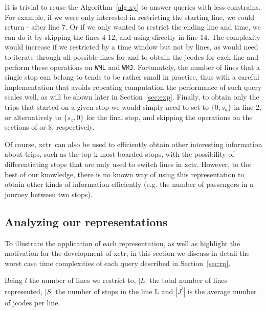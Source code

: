     It is trivial to reuse the Algorithm~\ref{alg:xy} to answer queries with less constrains. For example, if we were only interested in restricting the starting line, we could return - after line 7. Or if we only wanted to restrict the ending line and time, we can do it by skipping the lines 4-12, and using directly  in line 14. The complexity would increase if we restricted by a time window but not by lines, as would need to iterate through all possible lines for  and  to obtain the jcodes for each line and perform these operations on \texttt{WML} and \texttt{WMJ}. Fortunately, the number of lines that a single stop can belong to tends to be rather small in practice, thus with a careful implementation that avoids repeating computation the performance of such query scales well, as will be shown later in Section~\ref{sec:exp}. Finally, to obtain only the trips that started on a given stop we would simply need to set  to $\{0,s_a\}$ in line 2, or alternatively to $\{s_z,0\}$ for the final stop, and skipping the operations on the sections of  or $\$$, respectively.
    
    Of course, \gls{xctr}~can also be used to efficiently obtain other interesting information about trips, such as the top k most boarded stops, 
    with the possibility of differentiating stops that are only used to switch lines in \gls{xctr}. However, to the best of our knowledge, there is no known way of using this representation to obtain other kinds of information efficiently (e.g. the number of passengers in a journey between two stops).
	
	\subsection{Analyzing our representations}
	To illustrate the application of each representation, as well as highlight the motivation for the development of \gls{xctr}, in this section we discuss in detail the worst case time complexities of each query described in Section~\ref{sec:rq}. 

    Being $l$ the number of lines we restrict to, $|L|$ the total number of lines represented, $|S|$ the number of stops in the line L and $\bar{|J^l|}$ is the average number of jcodes per line.
    

